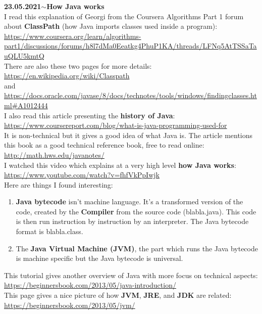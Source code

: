 \documentclass[11pt,a4paper]{article}
\newenvironment{loggentry}[2]%
{\noindent\textbf{#1}\hspace{1cm}$\mathbf{\sim}$\text{ }\textbf{#2}\\}{\vspace{0.5cm}}
\begin{document}
\begin{loggentry}{23.05.2021}{How Java works}

I read this explanation of Georgi from the Coursera Algorithms Part 1 forum about \textbf{ClassPath} (how Java imports classes used inside a program):\\
\url{https://www.coursera.org/learn/algorithms-part1/discussions/forums/h8l7dMa0Eeatkg4PhuP1KA/threads/LFNq5AtTSSaTauQLU5kmtQ}\\
There are also these two pages for more details:\\
\url{https://en.wikipedia.org/wiki/Classpath}\\
and\\
\url{https://docs.oracle.com/javase/8/docs/technotes/tools/windows/findingclasses.html#A1012444}\\

I also read this article presenting the \textbf{history of Java}:\\
\url{https://www.coursereport.com/blog/what-is-java-programming-used-for}\\
It is non-technical but it gives a good idea of what Java is. The article mentions this book as a good technical reference book, free to read online:\\
\url{http://math.hws.edu/javanotes/}\\

I watched this video which explains at a very high level \textbf{how Java works}:\\
\url{https://www.youtube.com/watch?v=fhfVkPpIwjk}\\
Here are things I found interesting:\\
\begin{enumerate}
\item \textbf{Java bytecode} isn't machine language. It's a transformed version of the code, created by the \textbf{Compiler} from the source code (blabla.java). This code is then run instruction by instruction by an interpreter. The Java bytecode format is blabla.class.
\item The \textbf{Java Virtual Machine (JVM)}, the part which runs the Java bytecode is machine specific but the Java bytecode is universal.
\end{enumerate}

This tutorial gives another overview of Java with more focus on technical aspects:\\
\url{https://beginnersbook.com/2013/05/java-introduction/}\\
This page gives a nice picture of how \textbf{JVM}, \textbf{JRE}, and \textbf{JDK} are related:\\
\url{https://beginnersbook.com/2013/05/jvm/}

\end{loggentry}
\end{document}
